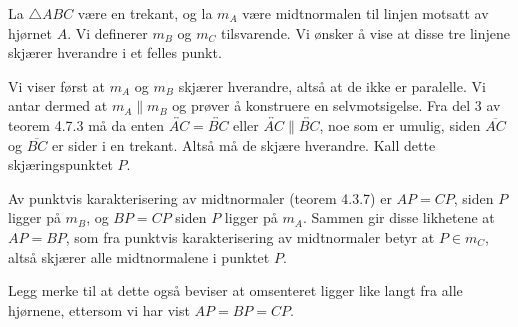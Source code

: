
\begin{oppgave}[5.6.5]
    La $\triangle ABC$ være en trekant, og la $m_A$ være midtnormalen til linjen motsatt av hjørnet $A$. 
    Vi definerer $m_B$ og $m_C$ tilsvarende. 
    Vi ønsker å vise at disse tre linjene skjærer hverandre i et felles punkt. 

    Vi viser først at $m_A$ og $m_B$ skjærer hverandre, altså at de ikke er paralelle. 
    Vi antar dermed at $m_A\parallel m_B$ og prøver å konstruere en selvmotsigelse. 
    Fra del 3 av teorem 4.7.3  må da enten $\overleftrightarrow{AC}=\overleftrightarrow{BC}$ eller $\overleftrightarrow{AC}\parallel \overleftrightarrow{BC}$, noe som er umulig, siden $\overline{AC}$ og $\overline{BC}$ er sider i en trekant. 
    Altså må de skjære hverandre. 
    Kall dette skjæringspunktet $P$. 

    Av punktvis karakterisering av midtnormaler (teorem 4.3.7) er $AP=CP$, siden $P$ ligger på $m_B$, og $BP=CP$ siden $P$ ligger på $m_A$. 
    Sammen gir disse likhetene at $AP=BP$, som fra punktvis karakterisering av midtnormaler betyr at $P\in m_C$, altså skjærer alle midtnormalene i punktet $P$. 

    Legg merke til at dette også beviser at omsenteret ligger like langt fra alle hjørnene, ettersom vi har vist $AP=BP=CP$. 

    \begin{figure}[H]
        \centering
         
    \end{figure}
\end{oppgave}

